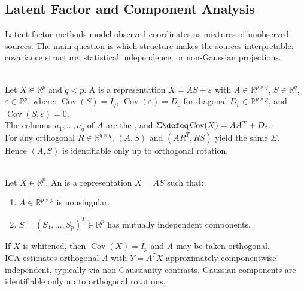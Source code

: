 \subsection{Latent Factor and Component Analysis}

Latent factor methods model observed coordinates as mixtures of unobserved sources.  The main question is which structure makes the sources interpretable: covariance structure, statistical independence, or non-Gaussian projections.

\begin{definition} \label{def:sl-factor-analysis-latent-model} \\
Let $X\in\mathbb{R}^p$ and $q<p$. A  is a representation $X=AS+\varepsilon$ with $A\in\mathbb{R}^{p\times q}$, $S\in\mathbb{R}^q$, $\varepsilon\in\mathbb{R}^p$, where: $\operatorname{Cov}(S)=I_q$, $\operatorname{Cov}(\varepsilon)=D_\varepsilon$ for diagonal $D_\varepsilon\in\mathbb{R}^{p\times p}$, and $\operatorname{Cov}(S,\varepsilon)=0$.\\
The columns $a_1,\ldots,a_q$ of $A$ are the , and $\Sigma\defeq\operatorname{Cov}(X)=AA^T+D_\varepsilon$.\\
For any orthogonal $R\in\mathbb{R}^{q\times q}$, $(A,S)$ and $(AR^T,RS)$ yield the same $\Sigma$.\\
Hence $(A,S)$ is identifiable only up to orthogonal rotation.
\end{definition}

\begin{definition} \label{def:sl-independent-component-analysis} \\
Let $X\in\mathbb{R}^p$. An  is a representation $X=AS$ such that:
\begin{enumerate}[label=(\roman*)]
\setlength{\itemsep}{0pt}
\item $A\in\mathbb{R}^{p\times p}$ is nonsingular.
\item $S=(S_1,\ldots,S_p)^T\in\mathbb{R}^p$ has mutually independent components.
\end{enumerate}
If $X$ is whitened, then $\operatorname{Cov}(X)=I_p$ and $A$ may be taken orthogonal.\\
ICA estimates orthogonal $A$ with $Y=A^TX$ approximately componentwise independent, typically via non-Gaussianity contrasts. Gaussian components are identifiable only up to orthogonal rotations.
\end{definition}

